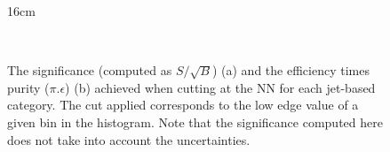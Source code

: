\begin{figure}[H!]{16cm}
	\vspace{-20cm}
	\caption{The significance (computed as $S/\sqrt{B}$) (a) and the efficiency times purity ($\pi.\epsilon$) (b) achieved when cutting at the NN for each jet-based category. The cut applied corresponds to the low edge value of a given bin in the histogram. Note that the significance computed here does not take into account the uncertainties.}
	\\
\end{figure}

		
